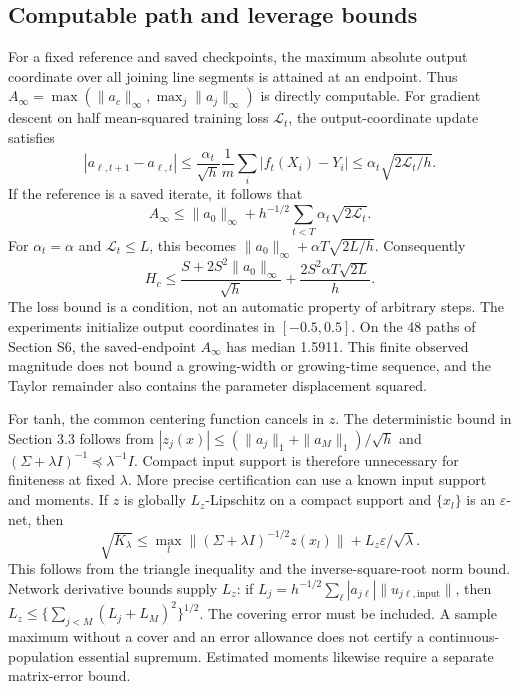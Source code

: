 \documentclass[pdflatex,sn-mathphys-ay]{sn-jnl}
\theoremstyle{remark}\newtheorem{remark}[theorem]{Remark}
\begin{document}
\subsection{Computable path and leverage bounds}
For a fixed reference and saved checkpoints, the maximum absolute output coordinate over all joining line segments is attained at an endpoint. Thus $A_\infty=\max(\|a_c\|_\infty,\max_j\|a_j\|_\infty)$ is directly computable. For gradient descent on half mean-squared training loss $\mathcal L_t$, the output-coordinate update satisfies
\[
 |a_{\ell,t+1}-a_{\ell,t}|
 \leq\frac{\alpha_t}{\sqrt h}\frac1m\sum_i|f_t(X_i)-Y_i|
 \leq\alpha_t\sqrt{2\mathcal L_t/h}.
\]
If the reference is a saved iterate, it follows that
\[
 A_\infty\leq\|a_0\|_\infty+
 h^{-1/2}\sum_{t<T}\alpha_t\sqrt{2\mathcal L_t}.
\]
For $\alpha_t=\alpha$ and $\mathcal L_t\leq L$, this becomes $\|a_0\|_\infty+\alpha T\sqrt{2L/h}$. Consequently
\[
 H_c\leq\frac{S+2S^2\|a_0\|_\infty}{\sqrt h}
       +\frac{2S^2\alpha T\sqrt{2L}}h.
\]
The loss bound is a condition, not an automatic property of arbitrary steps. The experiments initialize output coordinates in $[-0.5,0.5]$. On the 48 paths of Section S6, the saved-endpoint $A_\infty$ has median 1.5911. This finite observed magnitude does not bound a growing-width or growing-time sequence, and the Taylor remainder also contains the parameter displacement squared.

For tanh, the common centering function cancels in $z$. The deterministic bound in Section 3.3 follows from $|z_j(x)|\leq(\|a_j\|_1+\|a_M\|_1)/\sqrt h$ and $(\Sigma+\lambda I)^{-1}\preceq\lambda^{-1}I$. Compact input support is therefore unnecessary for finiteness at fixed $\lambda$. More precise certification can use a known input support and moments. If $z$ is globally $L_z$-Lipschitz on a compact support and $\{x_l\}$ is an $\varepsilon$-net, then
\[
 \sqrt{K_\lambda}\leq
 \max_l\|(\Sigma+\lambda I)^{-1/2}z(x_l)\|
       +L_z\varepsilon/\sqrt\lambda.
\]
This follows from the triangle inequality and the inverse-square-root norm bound. Network derivative bounds supply $L_z$: if $L_j=h^{-1/2}\sum_\ell |a_{j\ell}|\|u_{j\ell,\mathrm{input}}\|$, then $L_z\leq\{\sum_{j<M}(L_j+L_M)^2\}^{1/2}$. The covering error must be included. A sample maximum without a cover and an error allowance does not certify a continuous-population essential supremum. Estimated moments likewise require a separate matrix-error bound.
\end{document}

